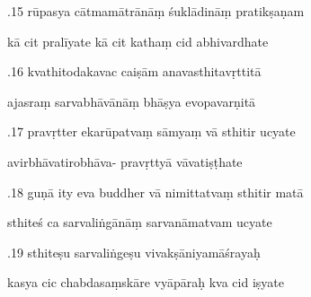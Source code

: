\documentclass[article,12pt,a4paper]{memoir}%
\newcounter{parCount}
\begin{document}
	  
	  \pstart {}.15 rūpasya cātmamātrānāṃ śuklādināṃ pratikṣaṇam 
	{}
	\pend%
      

	  
	  \pstart \leavevmode%
	kā cit pralīyate kā cit kathaṃ cid abhivardhate 
	{}
	\pend%
      

	  
	  \pstart {}.16 kvathitodakavac caiṣām anavasthitavṛttitā 
	{}
	\pend%
      

	  
	  \pstart \leavevmode%
	ajasraṃ sarvabhāvānāṃ bhāṣya evopavarṇitā 
	{}
	\pend%
      

	  
	  \pstart {}.17 pravṛtter ekarūpatvaṃ sāmyaṃ vā sthitir ucyate 
	{}
	\pend%
      

	  
	  \pstart \leavevmode%
	avirbhāvatirobhāva- pravṛttyā vāvatiṣṭhate 
	{}
	\pend%
      

	  
	  \pstart {}.18 guṇā ity eva buddher vā nimittatvaṃ sthitir matā 
	{}
	\pend%
      

	  
	  \pstart \leavevmode%
	sthiteś ca sarvaliṅgānāṃ sarvanāmatvam ucyate 
	{}
	\pend%
      

	  
	  \pstart {}.19 sthiteṣu sarvaliṅgeṣu vivakṣāniyamāśrayaḥ 
	{}
	\pend%
      

	  
	  \pstart \leavevmode%
	kasya cic chabdasaṃskāre vyāpāraḥ kva cid iṣyate 
	{}
	\pend%
      
\end{document}
